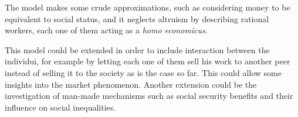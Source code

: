 The model makes some crude approximations, such as considering money to be equivalent to social status, and it neglects altruism by describing rational workers, each one of them acting as a \emph{homo economicus}.

This model could be extended in order to include interaction between the individui, for example by letting each one of them sell his work to another peer instead of selling it to the society as is the case so far. This could allow some insights into the market phenomenon. Another extension could be the investigation of man-made mechanisms such as social security benefits and their influence on social inequalities.
